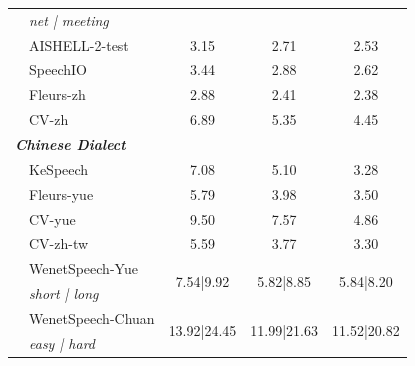 \begin{table}[ht]
{\begin{tabular}{@{}clccc@{}}
    & \textit{net | meeting} & & & \\
    & AISHELL-2-test         & 3.15  & 2.71  & 2.53 \\
    & SpeechIO               & 3.44  & 2.88  & 2.62 \\
    & Fleurs-zh              & 2.88  & 2.41  & 2.38 \\
    & CV-zh                  & 6.89  & 5.35  & 4.45 \\
\midrule
\multicolumn{5}{l}{\textit{\textbf{Chinese Dialect}}} \\ \midrule
    & KeSpeech               & 7.08  & 5.10  & 3.28 \\
    & Fleurs-yue             & 5.79  & 3.98  & 3.50 \\
    & CV-yue                 & 9.50  & 7.57  & 4.86 \\
    & CV-zh-tw               & 5.59  & 3.77  & 3.30 \\
    & WenetSpeech-Yue        & \multirow{2}{*}{7.54|9.92} & \multirow{2}{*}{5.82|8.85} & \multirow{2}{*}{5.84|8.20} \\
    & \textit{short | long}  &  &  &  \\
    & WenetSpeech-Chuan      & \multirow{2}{*}{13.92|24.45} & \multirow{2}{*}{11.99|21.63} & \multirow{2}{*}{11.52|20.82} \\
    & \textit{easy | hard }  &  &  &  \\
\bottomrule
\end{tabular}%
}
\end{table}


